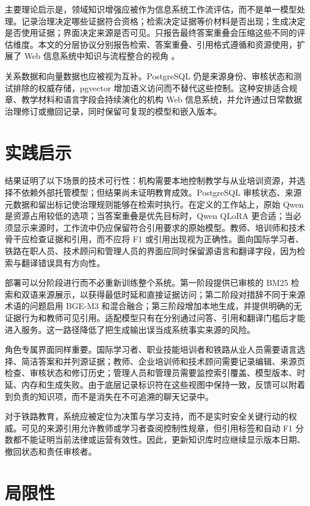 主要理论启示是，领域知识增强应被作为信息系统工作流评估，而不是单一模型处理。记录治理决定哪些证据符合资格；检索决定证据等价材料是否出现；生成决定是否使用证据；界面决定来源是否可见。只报告最终答案重叠会压缩这些不同的评估维度。本文的分层协议分别报告检索、答案重叠、引用格式遵循和资源使用，扩展了 Web 信息系统中知识与流程整合的视角 \citep{hubscher2021knowledge,yang2024legalqa}。

关系数据和向量数据也应被视为互补。PostgreSQL 仍是来源身份、审核状态和测试排除的权威存储，pgvector 增加语义访问而不替代这些控制。这种安排适合规章、教学材料和语言字段会持续演化的机构 Web 信息系统，并允许通过日常数据治理修订或撤回记录，同时保留可复现的模型和嵌入版本。

\section{实践启示}

结果证明了以下场景的技术可行性：机构需要本地控制教学与从业培训资源，并选择不依赖外部托管模型；但结果尚未证明教育成效。PostgreSQL 审核状态、来源元数据和留出标记使治理规则能够在检索时执行。在定义的工作站上，原始 Qwen 是资源占用较低的选项；当答案重叠是优先目标时，Qwen QLoRA 更合适；当必须显示来源时，工作流中仍应保留符合引用要求的原始模型。教师、培训师和技术骨干应检查证据和引用，而不应将 F1 或引用出现视为正确性。面向国际学习者、铁路在职人员、技术顾问和管理人员的界面应同时保留源语言和翻译字段，因为检索与翻译错误具有方向性。

部署可以分阶段进行而不必重新训练整个系统。第一阶段提供已审核的 BM25 检索和双语来源展示，以获得最低时延和直接证据访问；第二阶段对措辞不同于来源术语的问题启用 BGE-M3 和混合融合；第三阶段增加本地生成，并提供明确的无证据行为和教师可见引用。适配模型只有在分别通过问答、引用和翻译门槛后才能进入服务。这一路径降低了把生成输出误当成系统事实来源的风险。

角色专属界面同样重要。国际学习者、职业技能培训者和铁路从业人员需要语言选择、简洁答案和并列源证据；教师、企业培训师和技术顾问需要记录编辑、来源页检查、审核状态和修订历史；管理人员和管理员需要监控索引覆盖、模型版本、时延、内存和生成失败。由于底层记录标识符在这些视图中保持一致，反馈可以附着到负责的知识项，而不是消失在不可追溯的聊天记录中。

对于铁路教育，系统应被定位为决策与学习支持，而不是实时安全关键行动的权威。可见的来源引用允许教师或学习者查阅控制性规章，但引用标签和自动 F1 分数都不能证明当前法律或运营有效性。因此，更新知识库时应继续显示版本日期、撤回状态和责任审核者。

\section{局限性}

